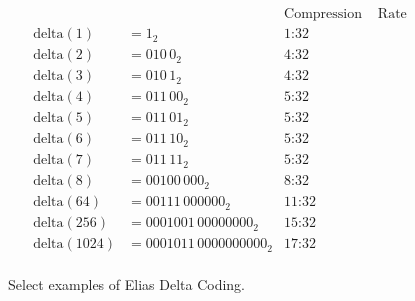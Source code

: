\begin{figure}
	
	\centering
	\begin{align*}
						&		&\text{Compression}&\text{ Rate}\\
		\mathrm{delta}(1) &= 1_2  &\text{1:32} \\
		\mathrm{delta}(2) &= 010\,0_2 &\text{4:32} \\
		\mathrm{delta}(3) &= 010\,1_2 &\text{4:32} \\
		\mathrm{delta}(4) &= 011\,00_2 &\text{5:32} \\
		\mathrm{delta}(5) &= 011\,01_2 &\text{5:32} \\
		\mathrm{delta}(6) &= 011\,10_2 &\text{5:32} \\
		\mathrm{delta}(7) &= 011\,11_2 &\text{5:32} \\
		\mathrm{delta}(8) &= 00100\,000_2 &\text{8:32}\\
		\mathrm{delta}(64) &= 00111\,000000_2 &\text{11:32}\\
		\mathrm{delta}(256) &= 0001001\,00000000_2 &\text{15:32} \\
		\mathrm{delta}(1024) &= 0001011\,0000000000_2 &\text{17:32} \\
	\end{align*}
	
	\caption{Select examples of Elias Delta Coding.}
	\label{fig:bg-comp-delta-ex}
\end{figure}
